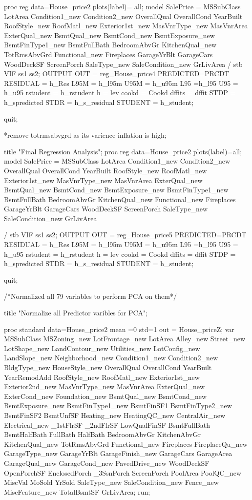 proc reg data=House_price2
plots(label)= all;
	model 	SalePrice =		MSSubClass		LotArea		Condition1_new	Condition2_new		
			OverallQual		OverallCond		YearBuilt	RoofStyle_new	RoofMatl_new	Exterior1st_new								
			MasVnrType_new	MasVnrArea		ExterQual_new	BsmtQual_new
			BsmtCond_new	BsmtExposure_new BsmtFinType1_new 	BsmtFullBath
			BedroomAbvGr	KitchenQual_new	TotRmsAbvGrd	Functional_new	Fireplaces			
			GarageYrBlt		GarageCars		WoodDeckSF	ScreenPorch		SaleType_new	
			SaleCondition_new	GrLivArea
			 /   stb     VIF ss1 ss2;
	OUTPUT OUT = reg_House_price4 PREDICTED=PRCDT RESIDUAL = h_Res
	L95M = h_l95m U95M  = h_u95m L95 =h_l95 U95 = h_u95 
	rstudent = h_rstudent h = lev cookd = Cookd dffits = dffit 
	STDP = h_spredicted STDR = h_s_residual STUDENT = h_student;
      
quit;

*remove totrmsabvgrd as its varience inflation is high;

title "Final Regression Analysis";
proc reg data=House_price2
plots(label)=all;
	model 	SalePrice =		MSSubClass		LotArea		Condition1_new	Condition2_new		
			OverallQual		OverallCond		YearBuilt	RoofStyle_new	RoofMatl_new	Exterior1st_new								
			MasVnrType_new	MasVnrArea		ExterQual_new	BsmtQual_new
			BsmtCond_new	BsmtExposure_new BsmtFinType1_new 	BsmtFullBath
			BedroomAbvGr	KitchenQual_new		Functional_new	Fireplaces			
			GarageYrBlt		GarageCars		WoodDeckSF	ScreenPorch		SaleType_new	
			SaleCondition_new	GrLivArea
			
			 /   stb     VIF ss1 ss2;
	OUTPUT OUT = reg_House_price5 PREDICTED=PRCDT RESIDUAL = h_Res
	L95M = h_l95m U95M  = h_u95m L95 =h_l95 U95 = h_u95 
	rstudent = h_rstudent h = lev cookd = Cookd dffits = dffit 
	STDP = h_spredicted STDR = h_s_residual STUDENT = h_student;
      
quit;

/*Normalized all 79 variables to perform PCA on them*/

title "Normalize all Predictor varibles for PCA";

proc standard data=House_price2 mean =0 std=1 
out = House_priceZ;
var MSSubClass		MSZoning_new	LotFrontage_new	LotArea				Alley_new
			Street_new		LotShape_new	LandContour_new	Utilities_new		LotConfig_new
			LandSlope_new	Neighborhood_new Condition1_new	Condition2_new		BldgType_new
			HouseStyle_new	OverallQual		OverallCond		YearBuilt			YearRemodAdd	
			RoofStyle_new	RoofMatl_new	Exterior1st_new	Exterior2nd_new		MasVnrType_new	
			MasVnrArea		ExterQual_new	ExterCond_new	Foundation_new		BsmtQual_new
			BsmtCond_new	BsmtExposure_new BsmtFinType1_new BsmtFinSF1		BsmtFinType2_new
			BsmtFinSF2		BsmtUnfSF		Heating_new		HeatingQC_new		CentralAir_new
			Electrical_new	_1stFlrSF		_2ndFlrSF		LowQualFinSF		BsmtFullBath
			BsmtHalfBath	FullBath		HalfBath		BedroomAbvGr		KitchenAbvGr
			KitchenQual_new	TotRmsAbvGrd	Functional_new	Fireplaces			FireplaceQu_new
			GarageType_new	GarageYrBlt		GarageFinish_new GarageCars			GarageArea
			GarageQual_new	GarageCond_new	PavedDrive_new	WoodDeckSF			OpenPorchSF
			EnclosedPorch	_3SsnPorch		ScreenPorch		PoolArea			PoolQC_new
			MiscVal			MoSold			YrSold			SaleType_new		SaleCondition_new	
			Fence_new		MiscFeature_new TotalBsmtSF		GrLivArea;
run;

